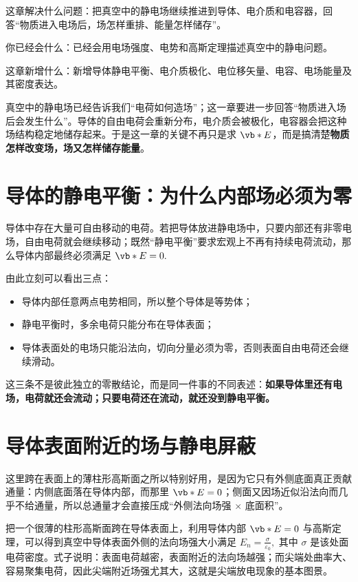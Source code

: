 \documentclass[lang=cn,11pt]{elegantbook}
\newcommand{\bridge}[1]{\begin{note}#1\end{note}}
\newcommand{\chapterroadmap}[3]{%
\begin{introduction}
 \item {\heiti 这章解决什么问题：}#1
 \item {\heiti 你已经会什么：}#2
 \item {\heiti 这章新增什么：}#3
\end{introduction}}
\begin{document}
\chapterroadmap
{把真空中的静电场继续推进到导体、电介质和电容器，回答“物质进入电场后，场怎样重排、能量怎样储存”。}
{已经会用电场强度、电势和高斯定理描述真空中的静电问题。}
{新增导体静电平衡、电介质极化、电位移矢量、电容、电场能量及其密度表达。}

\bridge{真空中的静电场已经告诉我们“电荷如何造场”；这一章要进一步回答“物质进入场后会发生什么”。导体的自由电荷会重新分布，电介质会被极化，电容器会把这种场结构稳定地储存起来。于是这一章的关键不再只是求 \(\vb*{E}\)，而是搞清楚\textbf{物质怎样改变场，场又怎样储存能量}。}

\section{导体的静电平衡：为什么内部场必须为零}

导体中存在大量可自由移动的电荷。若把导体放进静电场中，只要内部还有非零电场，自由电荷就会继续移动；既然“静电平衡”要求宏观上不再有持续电荷流动，那么导体内部最终必须满足
 \(\vb*{E}=0.\) 

由此立刻可以看出三点：
\begin{itemize}
 \item 导体内部任意两点电势相同，所以整个导体是等势体；
 \item 静电平衡时，多余电荷只能分布在导体表面；
 \item 导体表面处的电场只能沿法向，切向分量必须为零，否则表面自由电荷还会继续滑动。
\end{itemize}

\begin{remark}
这三条不是彼此独立的零散结论，而是同一件事的不同表述：\textbf{如果导体里还有电场，电荷就还会流动；只要电荷还在流动，就还没到静电平衡。}
\end{remark}

\section{导体表面附近的场与静电屏蔽}

这里跨在表面上的薄柱形高斯面之所以特别好用，是因为它只有外侧底面真正贡献通量：内侧底面落在导体内部，而那里 \(\vb*{E}=0\)；侧面又因场近似沿法向而几乎不给通量，所以总通量才会直接压成“外侧法向场强 \(\times\) 底面积”。

把一个很薄的柱形高斯面跨在导体表面上，利用导体内部 \(\vb*{E}=0\) 与高斯定理，可以得到真空中导体表面外侧的法向场强大小满足
 \(E_n=\frac{\sigma}{\varepsilon_0},\) 
其中 \(\sigma\) 是该处面电荷密度。式子说明：表面电荷越密，表面附近的法向场越强；而尖端处曲率大、容易聚集电荷，因此尖端附近场强尤其大，这就是尖端放电现象的基本图景。
\end{document}
